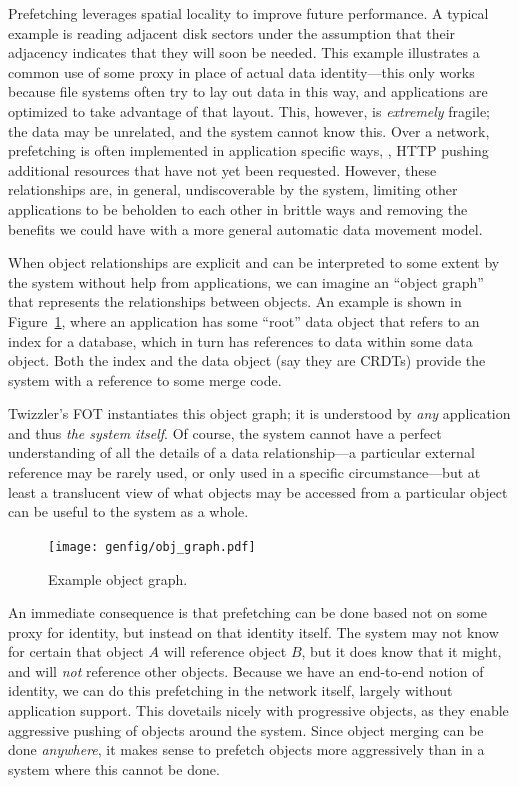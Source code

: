     Prefetching leverages spatial locality to improve future performance. A typical example is
    reading adjacent disk sectors under the assumption that their adjacency indicates that they
    will soon be needed. This example illustrates a common use of some proxy in place of actual data
    identity---this only works because file systems often try to lay out data in this way, and
    applications are optimized to take advantage of that layout. This, however, is \emph{extremely}
    fragile; the data may be unrelated, and the system cannot know this. Over a network, prefetching is
    often implemented in application specific ways, \eg, HTTP pushing additional resources that have
    not yet been requested. However, these relationships are, in general, undiscoverable by the system,
    limiting other applications to be beholden to each other in brittle ways
    and removing the benefits we could have with a more general automatic data movement
    model.

    When object relationships are explicit and can be interpreted to some extent by the
    system without help from applications, we can imagine an ``object graph'' that represents the
    relationships between objects. An example is shown in Figure~\ref{fig:ograph}, where
    an application has some ``root'' data object that refers to an index for a database, which in turn
    has references to data within some data object. Both the index and the data object (say they are
    CRDTs) provide the system with a reference to some merge code.

    Twizzler's FOT instantiates this object graph; it is understood by \emph{any} application
    and thus \emph{the system itself}.
    Of course, the system cannot have a
    perfect understanding of all the details of a data relationship---a particular external reference
    may be rarely used, or only used in a specific circumstance---but at least a translucent view of
    what objects may be accessed from a particular object can be useful to the system as a whole.

    \begin{figure}
        \centering
        \texttt{[image: genfig/obj\_graph.pdf]}
        \caption[Example object graph]{Example object graph.}
        \label{fig:ograph}
    \end{figure}

    An immediate consequence is that prefetching can be done based not on some proxy for identity,
    but instead on that identity itself. The system may not know for certain that object $A$ will
    reference object $B$, but it does know that it might, and will \emph{not} reference other objects.
    Because we have an end-to-end notion of identity, we can do this prefetching in the network itself,
    largely without application support.
    This dovetails nicely with progressive objects, as they enable aggressive pushing of objects around
    the system. Since object merging can be done \emph{anywhere}, it makes sense to prefetch objects
    more aggressively than in a system where this cannot be done.


